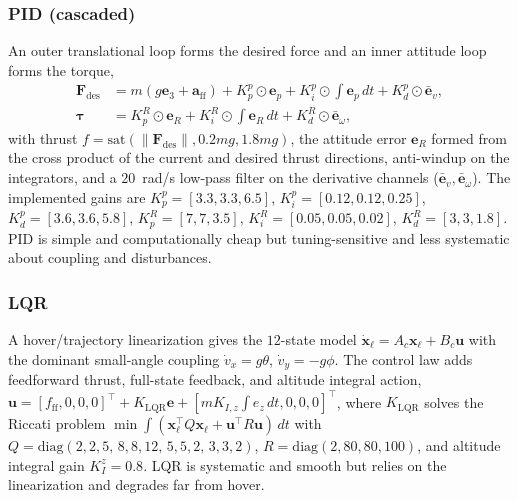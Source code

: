 \documentclass[12pt,a4paper]{article}
\begin{document}
\subsubsection{PID (cascaded)}
An outer translational loop forms the desired force and an inner attitude loop forms the
torque,
\begin{equation}
    \begin{aligned}
        \mathbf{F}_{\mathrm{des}} &= m(g\mathbf{e}_3 + \mathbf{a}_{\mathrm{ff}})
            + K_p^{p}\!\odot\mathbf{e}_p + K_i^{p}\!\odot\!\!\int\!\mathbf{e}_p\,dt
            + K_d^{p}\!\odot\bar{\mathbf{e}}_v, \\
        \bm{\tau} &= K_p^{R}\!\odot\mathbf{e}_R + K_i^{R}\!\odot\!\!\int\!\mathbf{e}_R\,dt
            + K_d^{R}\!\odot\bar{\mathbf{e}}_\omega,
    \end{aligned}
    \label{eq:pid}
\end{equation}
with thrust $f=\mathrm{sat}(\lVert\mathbf{F}_{\mathrm{des}}\rVert, 0.2mg, 1.8mg)$, the
attitude error $\mathbf{e}_R$ formed from the cross product of the current and desired
thrust directions, anti-windup on the integrators, and a $20$~rad/s low-pass filter on
the derivative channels ($\bar{\mathbf{e}}_v,\bar{\mathbf{e}}_\omega$). The implemented
gains are $K_p^{p}=[3.3,3.3,6.5]$, $K_i^{p}=[0.12,0.12,0.25]$, $K_d^{p}=[3.6,3.6,5.8]$,
$K_p^{R}=[7,7,3.5]$, $K_i^{R}=[0.05,0.05,0.02]$, $K_d^{R}=[3,3,1.8]$. PID is simple and
computationally cheap but tuning-sensitive and less systematic about coupling and
disturbances.

\subsubsection{LQR}
A hover/trajectory linearization gives the $12$-state model
$\dot{\mathbf{x}}_\ell = A_c\mathbf{x}_\ell + B_c\mathbf{u}$ with the dominant small-angle
coupling $\dot v_x = g\theta$, $\dot v_y = -g\phi$. The control law adds feedforward
thrust, full-state feedback, and altitude integral action, $\mathbf{u} =
[f_{\mathrm{ff}},0,0,0]^{\top} + K_{\mathrm{LQR}}\mathbf{e} + [mK_{I,z}\!\int e_z\,dt,0,0,0]^{\top}$,
where $K_{\mathrm{LQR}}$ solves the Riccati problem
$\min\int(\mathbf{x}_\ell^{\top}Q\mathbf{x}_\ell + \mathbf{u}^{\top}R\mathbf{u})\,dt$ with
$Q=\mathrm{diag}(2,2,5,\,8,8,12,\,5,5,2,\,3,3,2)$, $R=\mathrm{diag}(2,80,80,100)$, and
altitude integral gain $K_I^z=0.8$. LQR is systematic and smooth but relies on the
linearization and degrades far from hover.
\end{document}
